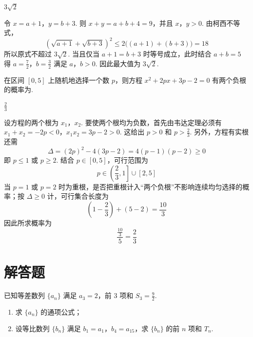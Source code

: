 \begin{answer}
\(3\sqrt{2}\)
\end{answer}

\begin{solution}
令 \(x=a+1\)，\(y=b+3\). 则 \(x+y=a+b+4=9\)，并且 \(x\)，\(y>0\). 由柯西不等式，
\[
\left(\sqrt{a+1}+\sqrt{b+3}\right)^{2}
\leqslant 2\bigl((a+1)+(b+3)\bigr)=18
\]
所以原式不超过 \(3\sqrt2\). 当且仅当 \(a+1=b+3\) 时等号成立，此时结合 \(a+b=5\) 得
\(a=\frac72\)，\(b=\frac32\)
满足 \(a\)，\(b>0\). 因此最大值为 \(3\sqrt2\).
\end{solution}

\begin{problem}
在区间 \([0, 5]\) 上随机地选择一个数 \(p\)，则方程 \(x^2 + 2px + 3p - 2 = 0\) 有两个负根的概率为\fillinblank{}.
\end{problem}

\begin{answer}
\(\frac{2}{3}\)
\end{answer}

\begin{solution}
设方程的两个根为 \(x_{1}\)，\(x_{2}\). 要使两个根均为负数，首先由韦达定理必须有
\(x_{1}+x_{2}=-2p<0\)，\(x_{1}x_{2}=3p-2>0\).
这给出 \(p>0\) 和 \(p>\frac23\). 另外，方程有实根还需
\[
\Delta=(2p)^{2}-4(3p-2)=4(p-1)(p-2)\geqslant0
\]
即 \(p\leqslant1\) 或 \(p\geqslant2\). 结合 \(p\in[0,5]\)，可行范围为
\[
p\in\left(\frac23,1\right]\cup[2,5]
\]
当 \(p=1\) 或 \(p=2\) 时为重根，是否把重根计入“两个负根”不影响连续均匀选择的概率；按 \(\Delta\geqslant0\) 计，可行集合长度为
\[
\left(1-\frac23\right)+(5-2)=\frac{10}{3}
\]
因此所求概率为
\[
\frac{\frac{10}{3}}5=\frac23
\]
\end{solution}

\section{解答题}

\begin{problem}
已知等差数列 \(\{a_{n}\}\) 满足 \(a_3 = 2\)，前 3 项和 \(S_3 = \frac{9}{2}\).

\begin{enumerate}
\item 求 \(\{a_{n}\}\) 的通项公式；
\item 设等比数列 \(\{b_{n}\}\) 满足 \(b_1 = a_1\)，\(b_4 = a_{15}\)，求 \(\{b_{n}\}\) 的前 \(n\) 项和 \(T_n\).
\end{enumerate}
\end{problem}

